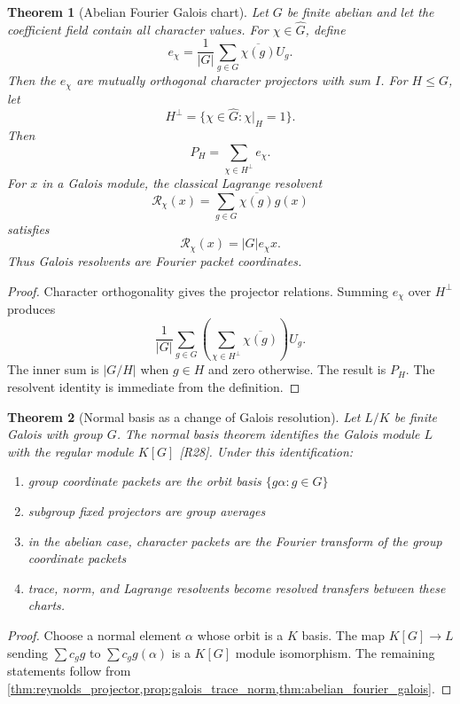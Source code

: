 \documentclass{aomart}
\newtheorem{theorem}{Theorem}[section]
\theoremstyle{definition}
\theoremstyle{remark}
\newcommand{\Rcite}[1]{\textup{[#1]}}
\begin{document}
\begin{theorem}[Abelian Fourier Galois chart]\label{thm:abelian_fourier_galois}
Let \(G\) be finite abelian and let the coefficient field contain all character values. For \(\chi\in\widehat G\), define
\[
 e_\chi
 =
 \frac1{|G|}\sum_{g\in G}\overline{\chi(g)}U_g.
\]
Then the \(e_\chi\) are mutually orthogonal character projectors with sum \(I\). For \(H\leq G\), let
\[
 H^\perp
 =
 \{\chi\in\widehat G:\chi|_H=1\}.
\]
Then
\[
 \boxed{
 P_H
 =
 \sum_{\chi\in H^\perp}e_\chi.
 }
\]
For \(x\) in a Galois module, the classical Lagrange resolvent
\[
 \mathcal R_\chi(x)
 =
 \sum_{g\in G}\overline{\chi(g)}g(x)
\]
satisfies
\[
 \boxed{
 \mathcal R_\chi(x)=|G|e_\chi x.
 }
\]
Thus Galois resolvents are Fourier packet coordinates.
\end{theorem}

\begin{proof}
Character orthogonality gives the projector relations. Summing \(e_\chi\) over \(H^\perp\) produces
\[
 \frac1{|G|}\sum_{g\in G}
 \left(\sum_{\chi\in H^\perp}\overline{\chi(g)}\right)U_g.
\]
The inner sum is \(|G/H|\) when \(g\in H\) and zero otherwise. The result is \(P_H\). The resolvent identity is immediate from the definition.
\end{proof}

\begin{theorem}[Normal basis as a change of Galois resolution]\label{thm:normal_basis_resolution}
Let \(L/K\) be finite Galois with group \(G\). The normal basis theorem identifies the Galois module \(L\) with the regular module \(K[G]\) \Rcite{R28}. Under this identification:
\begin{enumerate}
\item group coordinate packets are the orbit basis \(\{g\alpha:g\in G\}\)
\item subgroup fixed projectors are group averages
\item in the abelian case, character packets are the Fourier transform of the group coordinate packets
\item trace, norm, and Lagrange resolvents become resolved transfers between these charts.
\end{enumerate}
\end{theorem}

\begin{proof}
Choose a normal element \(\alpha\) whose orbit is a \(K\) basis. The map \(K[G]\to L\) sending \(\sum c_gg\) to \(\sum c_gg(\alpha)\) is a \(K[G]\) module isomorphism. The remaining statements follow from \cref{thm:reynolds_projector,prop:galois_trace_norm,thm:abelian_fourier_galois}.
\end{proof}
\end{document}
